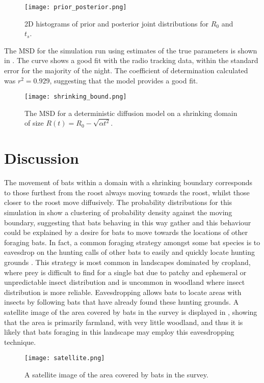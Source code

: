 \begin{figure} [h]
    \centering
        \texttt{[image: prior\_posterior.png]}
        \caption{2D histograms of prior and posterior joint distributions for $R_0$ and $t_s$.}
    \label{fig:posterior}
\end{figure}

 The MSD for the simulation run using estimates of the true parameters is shown in . The curve shows a good fit with the radio tracking data, within the standard error for the majority of the night. The coefficient of determination calculated was $r^2 = 0.929$, suggesting that the model provides a good fit.

\begin{figure} [h]
    \centering
        \texttt{[image: shrinking\_bound.png]}
        \caption{The MSD for a deterministic diffusion model on a shrinking domain of size $R(t) = R_0 - \sqrt{\alpha t^2}$. }
    \label{fig:fit}
\end{figure}

\section{Discussion}

 The movement of bats within a domain with a shrinking boundary corresponds to those furthest from the roost always moving towards the roost, whilst those closer to the roost move diffusively. The probability distributions for this simulation in  show a clustering of probability density against the moving boundary, suggesting that bats behaving in this way gather and this behaviour could be explained by a desire for bats to move towards the locations of other foraging bats. In fact, a common foraging strategy amongst some bat species is to eavesdrop on the hunting calls of other bats to easily and quickly locate hunting grounds \cite{roelekelandscape, egert2018resource}. This strategy is most common in landscapes dominated by cropland, where prey is difficult to find for a single bat due to patchy and ephemeral or unpredictable insect distribution and is uncommon in woodland where insect distribution is more reliable. Eavesdropping allows bats to locate areas with insects by following bats that have already found these hunting grounds. A satellite image of the area covered by bats in the survey is displayed in , showing that the area is primarily farmland, with very little woodland, and thus it is likely that bats foraging in this landscape may employ this eavesdropping technique.

\begin{figure} [h]
    \centering
        \texttt{[image: satellite.png]}
        \caption{A satellite image of the area covered by bats in the survey. }
    \label{fig:satellite}
\end{figure}
